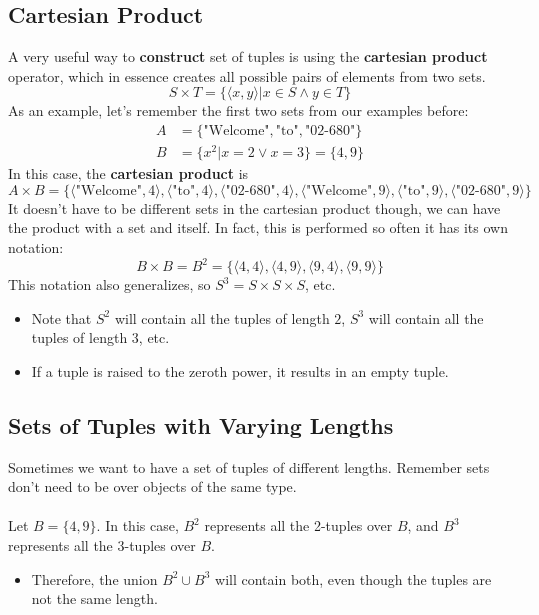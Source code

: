 \documentclass[10pt]{article}
\begin{document}
\subsection*{Cartesian Product}
A very useful way to \textbf{construct} set of tuples is using the \textbf{cartesian product} operator, which in essence creates all possible pairs of elements from two sets.
\[S \times T = \{\langle x, y \rangle | x \in S \land y \in T\}\]
As an example, let's remember the first two sets from our examples before:
\begin{align*}
    A &= \{\text{"Welcome"}, \text{"to"}, \text{"02-680"}\}\\
    B &= \{x^2 | x = 2 \lor x = 3\} = \{4, 9\}
\end{align*}
In this case, the \textbf{cartesian product} is
\[A \times B = \{\langle \text{"Welcome"}, 4\rangle, \langle \text{"to"}, 4\rangle, \langle \text{"02-680"}, 4\rangle, \langle \text{"Welcome"}, 9\rangle, \langle \text{"to"}, 9\rangle, \langle \text{"02-680"}, 9\rangle\} \]
It doesn't have to be different sets in the cartesian product though, we can have the product with a set and itself.  In fact, this is performed so often it has its own notation:
\[B \times B = B^2 = \{\langle 4, 4 \rangle, \langle 4, 9 \rangle, \langle 9, 4 \rangle, \langle 9, 9 \rangle\}\]
This notation also generalizes, so $S^3 = S \times S \times S$, etc.
\begin{itemize}
	\item Note that $S^2$ will contain all the tuples of length $2$, $S^3$ will contain all the tuples of length $3$, etc.
	\item If a tuple is raised to the zeroth power, it results in an empty tuple.
\end{itemize}

\subsection*{Sets of Tuples with Varying Lengths}
Sometimes we want to have a set of tuples of different lengths.  Remember sets don't need to be over objects of the same type.\\\\
Let $B = \{4, 9\}$.  In this case, $B^2$ represents all the 2-tuples over $B$, and $B^3$ represents all the 3-tuples over $B$.
\begin{itemize}
	\item Therefore, the union $B^2 \cup B^3$ will contain both, even though the tuples are not the same length.
\end{itemize}
\end{document}
